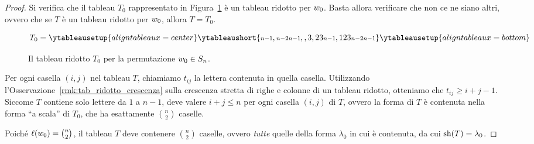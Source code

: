 \begin{proof}
    Si verifica che il tableau $T_0$
    rappresentato in Figura~\ref{fig:tableau_scala} \`e un tableau ridotto per $w_0$.
    Basta allora verificare che non ce ne siano altri, ovvero che se
    $T$ \`e un tableau ridotto per $w_0$, allora $T = T_0$.
    \begin{figure}[htbp]
        \centering
        \[
            T_0 = 
            \ytableausetup{aligntableaux=center}
            \ytableaushort{
                {\scriptstyle n-1},
                {\scriptstyle n-2}{\scriptstyle n-1},
                {}{}{},
                3{}{}{},
                23{}{}{\scriptstyle n-1},
                123{}{\scriptstyle n-2}{\scriptstyle n-1}
            }
            \ytableausetup{aligntableaux=bottom}
        \]
        \caption{
            Il tableau ridotto $T_0$ per la permutazione $w_0 \in S_n$.
        }
        \label{fig:tableau_scala}
    \end{figure}

    Per ogni casella $(i,j)$ nel tableau $T$, chiamiamo $t_{ij}$ la lettera
    contenuta in quella casella.
    Utilizzando l'Osservazione~\ref{rmk:tab_ridotto_crescenza} sulla crescenza stretta
    di righe e colonne di un tableau ridotto, otteniamo
    che $t_{ij} \geq i+j-1$.
    Siccome $T$ contiene solo lettere da $1$ a $n-1$, deve valere
    $i+j \le n$ per ogni casella $(i,j)$ di $T$, ovvero la forma di $T$ \`e contenuta
    nella forma ``a scala'' di $T_0$, che ha esattamente $\binom n 2$ caselle.

    Poich\'e $\operatorname{\ell}(w_0) = \binom n 2$, il tableau $T$ deve contenere $\binom n 2$ caselle,
    ovvero \emph{tutte} quelle della forma $\lambda_0$ in cui \`e contenuta,
    da cui $\operatorname{sh}(T) = \lambda_0$.




\end{proof}
